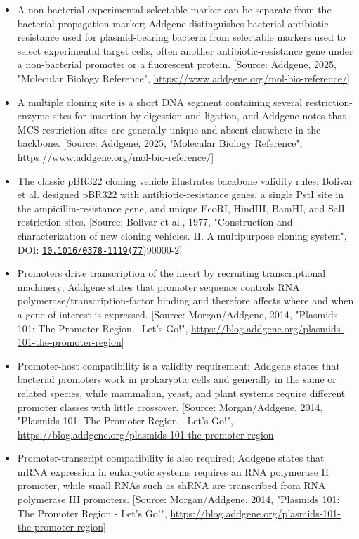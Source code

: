 \documentclass[11pt]{report}
\begin{document}
\begin{itemize}
\item A non-bacterial experimental selectable marker can be separate from the bacterial propagation marker; Addgene distinguishes bacterial antibiotic resistance used for plasmid-bearing bacteria from selectable markers used to select experimental target cells, often another antibiotic-resistance gene under a non-bacterial promoter or a fluorescent protein. [Source: Addgene, 2025, "Molecular Biology Reference", \url{https://www.addgene.org/mol-bio-reference/}]
\item A multiple cloning site is a short DNA segment containing several restriction-enzyme sites for insertion by digestion and ligation, and Addgene notes that MCS restriction sites are generally unique and absent elsewhere in the backbone. [Source: Addgene, 2025, "Molecular Biology Reference", \url{https://www.addgene.org/mol-bio-reference/}]
\item The classic pBR322 cloning vehicle illustrates backbone validity rules: Bolivar et al. designed pBR322 with antibiotic-resistance genes, a single PstI site in the ampicillin-resistance gene, and unique EcoRI, HindIII, BamHI, and SalI restriction sites. [Source: Bolivar et al., 1977, "Construction and characterization of new cloning vehicles. II. A multipurpose cloning system", DOI: \href{https://doi.org/10.1016/0378-1119(77}{\nolinkurl{10.1016/0378-1119(77}})90000-2]
\item Promoters drive transcription of the insert by recruiting transcriptional machinery; Addgene states that promoter sequence controls RNA polymerase/transcription-factor binding and therefore affects where and when a gene of interest is expressed. [Source: Morgan/Addgene, 2014, "Plasmids 101: The Promoter Region - Let's Go!", \url{https://blog.addgene.org/plasmids-101-the-promoter-region}]
\item Promoter-host compatibility is a validity requirement; Addgene states that bacterial promoters work in prokaryotic cells and generally in the same or related species, while mammalian, yeast, and plant systems require different promoter classes with little crossover. [Source: Morgan/Addgene, 2014, "Plasmids 101: The Promoter Region - Let's Go!", \url{https://blog.addgene.org/plasmids-101-the-promoter-region}]
\item Promoter-transcript compatibility is also required; Addgene states that mRNA expression in eukaryotic systems requires an RNA polymerase II promoter, while small RNAs such as shRNA are transcribed from RNA polymerase III promoters. [Source: Morgan/Addgene, 2014, "Plasmids 101: The Promoter Region - Let's Go!", \url{https://blog.addgene.org/plasmids-101-the-promoter-region}]

\end{itemize}
\end{document}
